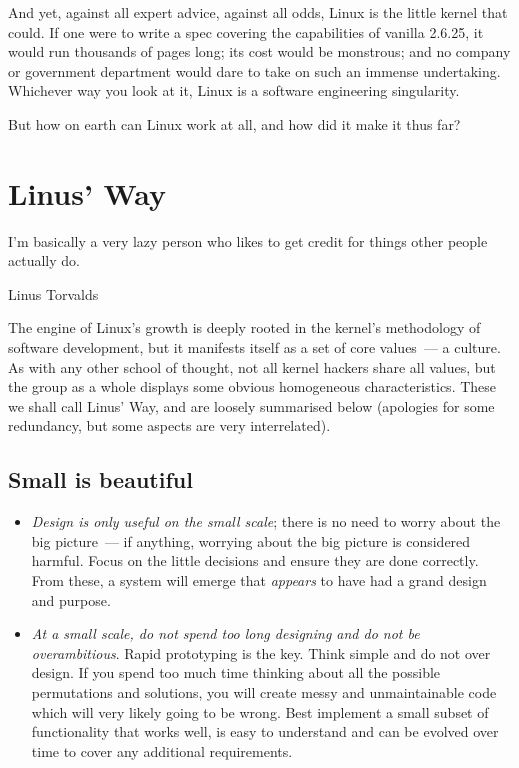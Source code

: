 \documentclass{book}
\begin{document}
And yet, against all expert advice, against all odds, Linux is the
little kernel that could. If one were to write a spec covering the
capabilities of vanilla 2.6.25, it would run thousands of pages long;
its cost would be monstrous; and no company or government department
would dare to take on such an immense undertaking. Whichever way you
look at it, Linux is a software engineering singularity.

But how on earth can Linux work at all, and how did it make it thus
far?

\section{Linus' Way}

\epigraph{I'm basically a very lazy person who likes to get credit for things other people actually do.}{Linus Torvalds}

The engine of Linux's growth is deeply rooted in the kernel's
methodology of software development, but it manifests itself as a set
of core values~--- a culture. As with any other school of thought,
not all kernel hackers share all values, but the group as a whole
displays some obvious homogeneous characteristics. These we shall call
Linus' Way, and are loosely summarised below (apologies for some
redundancy, but some aspects are very interrelated).

\subsection{Small is beautiful}

\begin{itemize}
\item \emph{Design is only useful on the small scale}; there is no
  need to worry about the big picture~--- if anything, worrying about
  the big picture is considered harmful. Focus on the little decisions
  and ensure they are done correctly. From these, a system will emerge
  that \emph{appears} to have had a grand design and purpose.
\item \emph{At a small scale, do not spend too long designing and do
  not be overambitious}. Rapid prototyping is the key. Think simple
  and do not over design. If you spend too much time thinking about
  all the possible permutations and solutions, you will create messy
  and unmaintainable code which will very likely going to be
  wrong. Best implement a small subset of functionality that works
  well, is easy to understand and can be evolved over time to cover
  any additional requirements.
\end{itemize}
\end{document}
